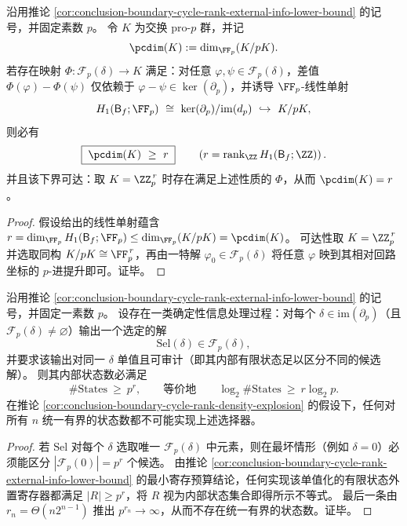 \begin{corollary}\label{cor:conclusion-pcdim-prop-cycle-rank-minimal}
沿用推论 \ref{cor:conclusion-boundary-cycle-rank-external-info-lower-bound} 的记号，并固定素数 \(p\)。
令 \(K\) 为交换 pro-\(p\) 群，并记
\[
\pcdim(K):=\dim_{\FF_p}(K/pK).
\]
若存在映射 \(\Phi:\mathcal F_p(\delta)\to K\) 满足：对任意 \(\varphi,\psi\in\mathcal F_p(\delta)\)，差值 \(\Phi(\varphi)-\Phi(\psi)\) 仅依赖于 \(\varphi-\psi\in\ker(\partial_p)\)，并诱导 \(\FF_p\)-线性单射
\[
H_1(\mathsf B_f;\FF_p)\ \cong\ \ker(\partial_p)/\mathrm{im}(d_p)\ \hookrightarrow\ K/pK,
\]
则必有
\[
\boxed{\;\pcdim(K)\ \ge\ r\;}
\qquad\left(r=\operatorname{rank}_{\ZZ}H_1(\mathsf B_f;\ZZ)\right).
\]
并且该下界可达：取 \(K=\ZZ_p^{\,r}\) 时存在满足上述性质的 \(\Phi\)，从而 \(\pcdim(K)=r\)。
\end{corollary}
\begin{proof}
假设给出的线性单射蕴含
\(
r=\dim_{\FF_p}H_1(\mathsf B_f;\FF_p)\le \dim_{\FF_p}(K/pK)=\pcdim(K)
\)。
可达性取 \(K=\ZZ_p^{\,r}\) 并选取同构 \(K/pK\cong \FF_p^{\,r}\)，再由一特解 \(\varphi_0\in\mathcal F_p(\delta)\) 将任意 \(\varphi\) 映到其相对回路坐标的 \(p\)-进提升即可。证毕。
\end{proof}

\begin{corollary}\label{cor:conclusion-canonical-lift-selector-memory-lb}
沿用推论 \ref{cor:conclusion-boundary-cycle-rank-external-info-lower-bound} 的记号，并固定一素数 \(p\)。
设存在一类确定性信息处理过程：对每个 \(\delta\in\mathrm{im}(\partial_p)\)（且 \(\mathcal F_p(\delta)\neq\varnothing\)）输出一个选定的解
\[
\mathrm{Sel}(\delta)\in \mathcal F_p(\delta),
\]
并要求该输出对同一 \(\delta\) 单值且可审计（即其内部有限状态足以区分不同的候选解）。
则其内部状态数必满足
\[
\#\mathrm{States}\ \ge\ p^{r},
\qquad\text{等价地}\qquad
\log_2\#\mathrm{States}\ \ge\ r\log_2 p.
\]
在推论 \ref{cor:conclusion-boundary-cycle-rank-density-explosion} 的假设下，任何对所有 \(n\) 统一有界的状态数都不可能实现上述选择器。
\end{corollary}
\begin{proof}
若 \(\mathrm{Sel}\) 对每个 \(\delta\) 选取唯一 \(\mathcal F_p(\delta)\) 中元素，则在最坏情形（例如 \(\delta=0\)）必须能区分 \(|\mathcal F_p(0)|=p^r\) 个候选。
由推论 \ref{cor:conclusion-boundary-cycle-rank-external-info-lower-bound} 的最小寄存预算结论，任何实现该单值化的有限状态外置寄存器都满足 \(|R|\ge p^r\)，将 \(R\) 视为内部状态集合即得所示不等式。
最后一条由 \(r_n=\Theta(n2^{n-1})\) 推出 \(p^{r_n}\to\infty\)，从而不存在统一有界的状态数。证毕。
\end{proof}

